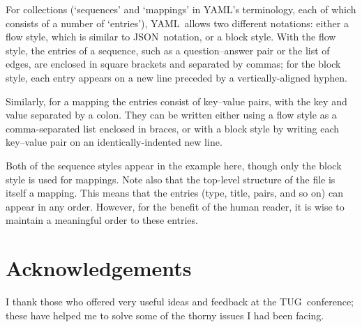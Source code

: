 \documentclass{article}
\def\YAML{{\small YAML}}
\def\JSON{{\small JSON}}
\def\TUG{{\small TUG}}
\begin{document}
For collections (`sequences' and `mappings' in \YAML's terminology,
each of which consists of a number of `entries'), \YAML\ allows two
different notations: either a flow style, which is similar to \JSON\
notation, or a block style.  With the flow style, the entries of a
sequence, such as a question--answer pair or the list of edges,
are enclosed in square brackets and separated by commas; for the block
style, each entry appears on a new line preceded by a
vertically-aligned hyphen.

Similarly, for a mapping the entries
consist of key--value pairs, with the key and value separated by a
colon.  They can be written either using a flow style as a
comma-separated list enclosed in braces, or with a block style by
writing each key--value pair on an identically-indented new line.

Both of the sequence styles appear in the example here, though only
the block style is used for mappings.  Note also that the top-level
structure of the file is itself a mapping.  This means that the
entries (type, title, pairs, and so on) can appear in any order.
However, for the benefit of the human reader, it is wise to maintain a
meaningful order to these entries.

\section*{Acknowledgements}

I thank those who offered very useful ideas and feedback at the \TUG\
conference; these have helped me to solve some of the thorny issues I
had been facing.

\smallskip


\end{document}
